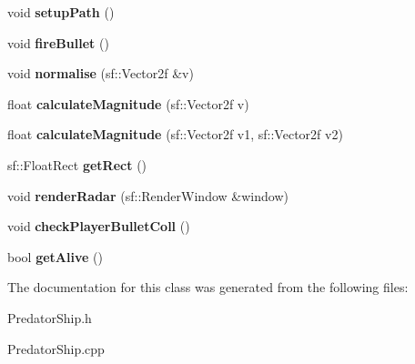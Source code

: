 \begin{DoxyCompactItemize}
$$void {\bfseries setup\+Path} ()
\item 
\mbox{\label{class_predator_ship_aac64b6592bb9e75c34335f0150a68d12}} 
void {\bfseries fire\+Bullet} ()
\item 
\mbox{\label{class_predator_ship_ad240f08c5f508a3447452d665080cf73}} 
void {\bfseries normalise} (sf\+::\+Vector2f \&v)
\item 
\mbox{\label{class_predator_ship_acaef1f914f1cd32445977927fd4f2d85}} 
float {\bfseries calculate\+Magnitude} (sf\+::\+Vector2f v)
\item 
\mbox{\label{class_predator_ship_a8000ba5e3ef3024de39cc7763048af72}} 
float {\bfseries calculate\+Magnitude} (sf\+::\+Vector2f v1, sf\+::\+Vector2f v2)
\item 
\mbox{\label{class_predator_ship_a91fdb3bab56c53417c0fa33237768f64}} 
sf\+::\+Float\+Rect {\bfseries get\+Rect} ()
\item 
\mbox{\label{class_predator_ship_a4f32416e9d9175ec61bab70008ad709f}} 
void {\bfseries render\+Radar} (sf\+::\+Render\+Window \&window)
\item 
\mbox{\label{class_predator_ship_a7a85b35820234fa6cefa69b6108498e7}} 
void {\bfseries check\+Player\+Bullet\+Coll} ()
\item 
\mbox{\label{class_predator_ship_aae0461ff2cd58e4b6249d3375b297281}} 
bool {\bfseries get\+Alive} ()
\end{DoxyCompactItemize}


The documentation for this class was generated from the following files\+:\begin{DoxyCompactItemize}
\item 
Predator\+Ship.\+h\item 
Predator\+Ship.\+cpp\end{DoxyCompactItemize}
